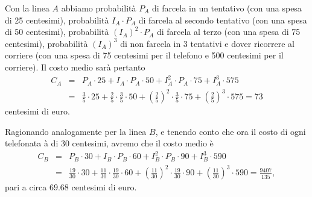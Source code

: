 {\DomandaC
Con la linea $A$ abbiamo probabilità $P_{A}$ di farcela in un tentativo (con una spesa di 25 centesimi), probabilità $I_{A}\cdot P_{A}$ di farcela al secondo tentativo (con una spesa di 50 centesimi), probabilità $(I_{A})^{2}\cdot P_{A}$ di farcela al terzo (con una spesa di 75 centesimi), probabilità $(I_{A})^{3}$ di non farcela in 3 tentativi e dover ricorrere al corriere (con una spesa di 75 centesimi per il telefono e 500 centesimi per il corriere). Il costo medio sarà pertanto
\begin{eqnarray*}
	C_{A} & = & P_{A}\cdot 25+I_{A}\cdot P_{A}\cdot 50+I_{A}^{2}\cdot
	P_{A}\cdot 75+I_{A}^{3}\cdot 575 \\
	& = & \frac{3}{5}\cdot 25+\frac{2}{5}\cdot \frac{3}{5}\cdot
	50+\left(\frac{2}{5}\right)^{2}\cdot \frac{3}{5}\cdot
	75+\left(\frac{2}{5}\right)^{3}\cdot 575=73
\end{eqnarray*}
centesimi di euro.

Ragionando analogamente per la linea $B$, e tenendo conto che ora il costo di ogni telefonata à di 30 centesimi, avremo che il costo medio è
\begin{eqnarray*}
	C_{B} & = & P_{B}\cdot 30+I_{B}\cdot P_{B}\cdot 60+I_{B}^{2}\cdot
	P_{B}\cdot 90+I_{B}^{3}\cdot 590 \\
	& = & \frac{19}{30}\cdot 30+\frac{11}{30}\cdot \frac{19}{30}\cdot
	60+\left(\frac{11}{30}\right)^{2}\cdot \frac{19}{30}\cdot
	90+\left(\frac{11}{30}\right)^{3}\cdot 590=\frac{9407}{135},
\end{eqnarray*}
pari a circa $69.68$ centesimi di euro. }

\renewcommand{\SoluzioniAlternative}{
}

\renewcommand{\Osservazioni}{
}

\renewcommand{\Commenti}{
}